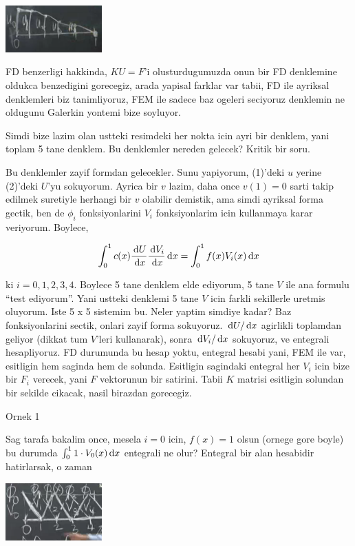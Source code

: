 \documentclass[12pt,fleqn]{article}\usepackage{../../common}
\begin{document}
\includegraphics[width=10em]{compscieng_1_18_04.png}

FD benzerligi hakkinda, $KU=F$'i olusturdugumuzda onun bir FD denklemine oldukca
benzedigini gorecegiz, arada yapisal farklar var tabii, FD ile ayriksal
denklemleri biz tanimliyoruz, FEM ile sadece baz ogeleri seciyoruz denklemin
ne oldugunu Galerkin yontemi bize soyluyor.

Simdi bize lazim olan ustteki resimdeki her nokta icin ayri bir denklem, yani
toplam 5 tane denklem. Bu denklemler nereden gelecek? Kritik bir soru.

Bu denklemler zayif formdan gelecekler. Sunu yapiyorum, (1)'deki $u$ yerine
(2)'deki $U$'yu sokuyorum. Ayrica bir $v$ lazim, daha once $v(1)=0$ sarti takip
edilmek suretiyle herhangi bir $v$ olabilir demistik, ama simdi ayriksal forma
gectik, ben de $\phi_i$ fonksiyonlarini $V_i$ fonksiyonlarim icin kullanmaya
karar veriyorum. Boylece,

$$
\int _{0}^{1} c(x) \frac{\,\mathrm{d} U}{\,\mathrm{d} x} \frac{\,\mathrm{d} V_i}{\,\mathrm{d} x} \,\mathrm{d} x =
\int _{0}^{1} f(x) V_i(x) \,\mathrm{d} x
$$

ki $i=0,1,2,3,4$. Boylece 5 tane denklem elde ediyorum, 5 tane $V$ ile ana
formulu ``test ediyorum''. Yani ustteki denklemi 5 tane $V$ icin farkli
sekillerle uretmis oluyorum. Iste 5 x 5 sistemim bu. Neler yaptim simdiye kadar?
Baz fonksiyonlarini sectik, onlari zayif forma sokuyoruz. $\,\mathrm{d} U / \,\mathrm{d} x$
agirlikli toplamdan geliyor (dikkat tum $V$'leri kullanarak), sonra
$\,\mathrm{d} V_i / \,\mathrm{d} x$ sokuyoruz, ve entegrali hesapliyoruz. FD durumunda bu
hesap yoktu, entegral hesabi yani, FEM ile var, esitligin hem saginda hem de
solunda.  Esitligin sagindaki entegral her $V_i$ icin bize bir $F_i$ verecek,
yani $F$ vektorunun bir satirini. Tabii $K$ matrisi esitligin solundan
bir sekilde cikacak, nasil birazdan gorecegiz.

Ornek 1

Sag tarafa bakalim once, mesela $i=0$ icin, $f(x)=1$ olsun (ornege gore
boyle) bu durumda $\int_{0}^{1} 1 \cdot V_0(x) \,\mathrm{d} x$ entegrali ne
olur? Entegral bir alan hesabidir hatirlarsak, o zaman 

\includegraphics[width=10em]{compscieng_1_18_05.png}
\end{document}
